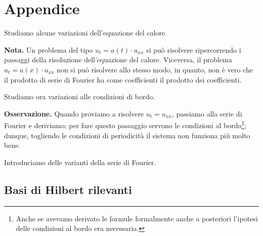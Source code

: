 \section{Appendice}

Studiamo alcune variazioni dell'equazione del calore.

\textbf{Nota.} Un problema del tipo $u_t = a(t) \cdot u_{xx}$ si può risolvere ripercorrendo i passaggi della risoluzione dell'equazione del calore.
Viceversa, il problema $u_t = a(x) \cdot u_{xx}$ non si può risolvere allo stesso modo, in quanto, non è vero che il prodotto di serie di Fourier ha come coefficienti il prodotto dei coefficienti.

Studiamo ora variazioni alle condizioni di bordo.

\textbf{Osservazione.} Quando proviamo a risolvere $u_t = u_{xx}$, passiamo alla serie di Fourier e deriviamo; per fare questo passaggio servono le condizioni al bordo\footnote{Anche se avevamo derivato le formule formalmente anche a posteriori l'ipotesi delle condizioni al bordo era necessaria.}; dunque, togliendo le condizioni di periodicità il sistema non funziona più molto bene.

Introduciamo delle varianti della serie di Fourier.

\subsection{Basi di Hilbert rilevanti}

